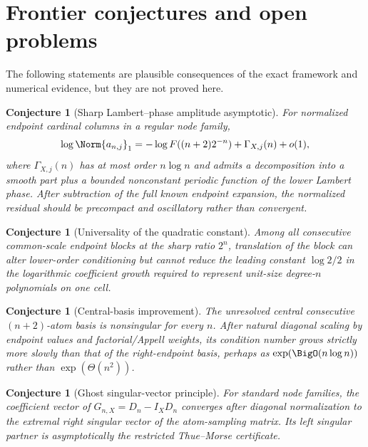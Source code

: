 \documentclass[11pt,oneside]{article}
\newtheorem{conjecture}[theorem]{Conjecture}
\theoremstyle{definition}
\theoremstyle{remark}
\newcommand{\1}{\mathbf{1}}
\begin{document}
\section{Frontier conjectures and open problems}
\label{sec:conjectures}

The following statements are plausible consequences of the exact framework
and numerical evidence, but they are not proved here.

\begin{conjecture}[Sharp Lambert--phase amplitude asymptotic]
\label{conj:sharp-lambert}
For normalized endpoint cardinal columns in a regular node family,
\begin{equation}
 \log\Norm{a_{n,j}}_1
 =-\log F((n+2)2^{-n})+\Gamma_{X,j}(n)+o(1),
 \label{eq:sharp-lambert-conj}
\end{equation}
where $\Gamma_{X,j}(n)$ has at most order $n\log n$ and admits a decomposition
into a smooth part plus a bounded nonconstant periodic function of the lower
Lambert phase.  After subtraction of the full known endpoint expansion, the
normalized residual should be precompact and oscillatory rather than
convergent.
\end{conjecture}

\begin{conjecture}[Universality of the quadratic constant]
\label{conj:universal-half}
Among all consecutive common-scale endpoint blocks at the sharp ratio $2^n$,
translation of the block can alter lower-order conditioning but cannot reduce
the leading constant $\log2/2$ in the logarithmic coefficient growth required
to represent unit-size degree-$n$ polynomials on one cell.
\end{conjecture}

\begin{conjecture}[Central-basis improvement]
\label{conj:central}
The unresolved central consecutive $(n+2)$-atom basis is nonsingular for every
$n$.  After natural diagonal scaling by endpoint values and factorial/Appell
weights, its condition number grows strictly more slowly than that of the
right-endpoint basis, perhaps as $\exp(\BigO(n\log n))$ rather than
$\exp(\Theta(n^2))$.
\end{conjecture}

\begin{conjecture}[Ghost singular-vector principle]
\label{conj:ghost-sv}
For standard node families, the coefficient vector of
$G_{n,X}=D_n-I_XD_n$ converges after diagonal normalization to the extremal
right singular vector of the atom-sampling matrix.  Its left singular partner
is asymptotically the restricted Thue--Morse certificate.
\end{conjecture}
\end{document}
